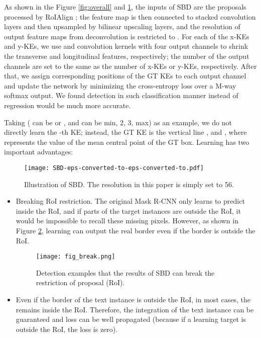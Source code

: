 \documentclass{article}
\begin{document}
As shown in the Figure \ref{fig:overall} and \ref{fig:SBD}, the inputs of SBD are the proposals processed by RoIAlign \cite{he2017mask}; the feature map is then connected to stacked convolution layers and then upsampled by  bilinear upscaling layers, and the resolution of output feature maps  from deconvolution is restricted to . For each of the x-KEs and y-KEs, we use  and  convolution kernels with four output channels to shrink the transverse and longitudinal features, respectively; the number of the output channels are set to the same as the number of x-KEs or y-KEs, respectively. After that, we assign corresponding positions of the GT KEs to each output channel and update the network by minimizing the cross-entropy loss {} over a M-way softmax output. We found detection in such classification manner instead of regression would be much more accurate. 

Taking  ( can be  or , and  can be min, 2, 3, max) as an example, we do not directly learn the -th KE; instead, the GT KE is the vertical line , and , where  represents the  value of the mean central point of the GT box. Learning  has two important advantages:
\begin{figure}[!t]
  \centering
  \centerline{\texttt{[image: SBD-eps-converted-to-eps-converted-to.pdf]}}
  \caption{Illustration of SBD. The resolution  in this paper is simply set to 56.}\label{fig:SBD}
\end{figure}
\begin{itemize}
  \item Breaking RoI restriction. The original Mask R-CNN only learns to predict inside the RoI, and if parts of the target instances are outside the RoI, it would be impossible to recall these missing pixels. However, as shown in Figure \ref{fig:break}, learning  can output the real border even if the border is outside the RoI.
  \begin{figure}[!t]
    \centering
    \centerline{\texttt{[image: fig\_break.png]}}
    \caption{Detection examples that the results of SBD can break the restriction of proposal (RoI).}\label{fig:break}
  \end{figure}
  \item Even if the border of the text instance is outside the RoI, in most cases, the  remains inside the RoI. Therefore, the integration of the text instance can be guaranteed and loss can be well propagated (because if a learning target is outside the RoI, the loss is zero).
\end{itemize}
\end{document}
